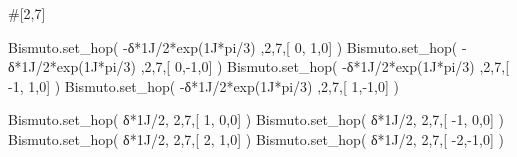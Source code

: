 \documentclass[
  letterpaper,
  DIV=11,
  numbers=noendperiod]{scrreprt}
\newenvironment{Shaded}{\begin{snugshade}}{\end{snugshade}}
\newcommand{\CommentTok}[1]{\textcolor[rgb]{0.37,0.37,0.37}{#1}}
\newcommand{\DecValTok}[1]{\textcolor[rgb]{0.68,0.00,0.00}{#1}}
\newcommand{\NormalTok}[1]{\textcolor[rgb]{0.00,0.23,0.31}{#1}}
\newcommand{\OperatorTok}[1]{\textcolor[rgb]{0.37,0.37,0.37}{#1}}
\newcommand{\OtherTok}[1]{\textcolor[rgb]{0.00,0.23,0.31}{#1}}
\begin{document}
\begin{Shaded}
\begin{Highlighting}[]
\CommentTok{\#[2,7]}

\NormalTok{Bismuto.set\_hop(  }\OperatorTok{{-}}\NormalTok{δ}\OperatorTok{*}\OtherTok{1J}\OperatorTok{/}\DecValTok{2}\OperatorTok{*}\NormalTok{exp(}\OtherTok{1J}\OperatorTok{*}\NormalTok{pi}\OperatorTok{/}\DecValTok{3}\NormalTok{) ,}\DecValTok{2}\NormalTok{,}\DecValTok{7}\NormalTok{,[  }\DecValTok{0}\NormalTok{, }\DecValTok{1}\NormalTok{,}\DecValTok{0}\NormalTok{] )}
\NormalTok{Bismuto.set\_hop(  }\OperatorTok{{-}}\NormalTok{δ}\OperatorTok{*}\OtherTok{1J}\OperatorTok{/}\DecValTok{2}\OperatorTok{*}\NormalTok{exp(}\OtherTok{1J}\OperatorTok{*}\NormalTok{pi}\OperatorTok{/}\DecValTok{3}\NormalTok{) ,}\DecValTok{2}\NormalTok{,}\DecValTok{7}\NormalTok{,[  }\DecValTok{0}\NormalTok{,}\OperatorTok{{-}}\DecValTok{1}\NormalTok{,}\DecValTok{0}\NormalTok{] )}
\NormalTok{Bismuto.set\_hop(  }\OperatorTok{{-}}\NormalTok{δ}\OperatorTok{*}\OtherTok{1J}\OperatorTok{/}\DecValTok{2}\OperatorTok{*}\NormalTok{exp(}\OtherTok{1J}\OperatorTok{*}\NormalTok{pi}\OperatorTok{/}\DecValTok{3}\NormalTok{) ,}\DecValTok{2}\NormalTok{,}\DecValTok{7}\NormalTok{,[ }\OperatorTok{{-}}\DecValTok{1}\NormalTok{, }\DecValTok{1}\NormalTok{,}\DecValTok{0}\NormalTok{] )}
\NormalTok{Bismuto.set\_hop(  }\OperatorTok{{-}}\NormalTok{δ}\OperatorTok{*}\OtherTok{1J}\OperatorTok{/}\DecValTok{2}\OperatorTok{*}\NormalTok{exp(}\OtherTok{1J}\OperatorTok{*}\NormalTok{pi}\OperatorTok{/}\DecValTok{3}\NormalTok{) ,}\DecValTok{2}\NormalTok{,}\DecValTok{7}\NormalTok{,[  }\DecValTok{1}\NormalTok{,}\OperatorTok{{-}}\DecValTok{1}\NormalTok{,}\DecValTok{0}\NormalTok{] )}

\NormalTok{Bismuto.set\_hop(   δ}\OperatorTok{*}\OtherTok{1J}\OperatorTok{/}\DecValTok{2}\NormalTok{, }\DecValTok{2}\NormalTok{,}\DecValTok{7}\NormalTok{,[  }\DecValTok{1}\NormalTok{, }\DecValTok{0}\NormalTok{,}\DecValTok{0}\NormalTok{] )}
\NormalTok{Bismuto.set\_hop(   δ}\OperatorTok{*}\OtherTok{1J}\OperatorTok{/}\DecValTok{2}\NormalTok{, }\DecValTok{2}\NormalTok{,}\DecValTok{7}\NormalTok{,[ }\OperatorTok{{-}}\DecValTok{1}\NormalTok{, }\DecValTok{0}\NormalTok{,}\DecValTok{0}\NormalTok{] )}
\NormalTok{Bismuto.set\_hop(   δ}\OperatorTok{*}\OtherTok{1J}\OperatorTok{/}\DecValTok{2}\NormalTok{, }\DecValTok{2}\NormalTok{,}\DecValTok{7}\NormalTok{,[  }\DecValTok{2}\NormalTok{, }\DecValTok{1}\NormalTok{,}\DecValTok{0}\NormalTok{] )}
\NormalTok{Bismuto.set\_hop(   δ}\OperatorTok{*}\OtherTok{1J}\OperatorTok{/}\DecValTok{2}\NormalTok{, }\DecValTok{2}\NormalTok{,}\DecValTok{7}\NormalTok{,[ }\OperatorTok{{-}}\DecValTok{2}\NormalTok{,}\OperatorTok{{-}}\DecValTok{1}\NormalTok{,}\DecValTok{0}\NormalTok{] ) }


\end{Highlighting}
\end{Shaded}
\end{document}
